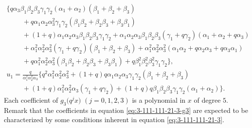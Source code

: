 \documentclass[pdftex]{sigma}
\numberwithin{equation}{section}
\theoremstyle{definition}
\begin{document}
\begin{gather*}
\bigl\{ q\alpha_3\beta_1\beta_2\beta_3\gamma_1\gamma_2(\alpha_1 + \alpha_2)(\beta_1 + \beta_2 + \beta_3) \\
\phantom{u_2 =}{} + q\alpha_1\alpha_2\alpha_3^2\gamma_1\gamma_2(\beta_1\beta_2 + \beta_2\beta_3 + \beta_3\beta_1) \\
\phantom{u_2 =}{} + (1 + q)\alpha_1\alpha_2\alpha_3\beta_1\beta_2\beta_3\gamma_1\gamma_2 + \alpha_1\alpha_2\alpha_3\beta_1\beta_2\beta_3(\gamma_1 + q\gamma_2)(\alpha_1 + \alpha_2 + q\alpha_3) \\
\phantom{u_2 =}{} + \alpha_1^2\alpha_2^2\alpha_3^2(\gamma_1 + q\gamma_2)(\beta_1 + \beta_2 + \beta_3) + \alpha_1^2\alpha_2^2\alpha_3^2(\alpha_1\alpha_2 + q\alpha_2\alpha_3 + q\alpha_3\alpha_1) \\
\phantom{u_2 =}{} + q\alpha_1^2\alpha_2^2\alpha_3^2(\beta_1\beta_2 + \beta_2\beta_3 + \beta_3\beta_1) + q\beta_1^2\beta_2^2\beta_3^2\gamma_1\gamma_2 \bigr\}, \\
u_1 = \frac{q}{\alpha_1^2\alpha_2^2\alpha_3}
\bigl\{ q^2\alpha_1^2\alpha_2^2\alpha_3^2 + (1 + q)q\alpha_1\alpha_2\alpha_3\gamma_1\gamma_2(\beta_1 + \beta_2 + \beta_3) \\
\phantom{u_1 =}{} + (1 + q)\alpha_1^2\alpha_2^2\alpha_3(\gamma_1 + q\gamma_2) + (1 + q)q\beta_1\beta_2\beta_3\gamma_1\gamma_2(\alpha_1 + \alpha_2) \bigr\}.
\end{gather*}
Each coefficient of $g_3 \bigl(q^j x\bigr)$ $(j=0,1,2,3)$ is a polynomial in $x$ of degree $5$.
Remark that the coefficients in equation \eqref{eq:3-111-111-21-3-g3} are expected to be characterized by some conditions
inherent in equation \eqref{eq:3-111-111-21-3}.
\end{document}
